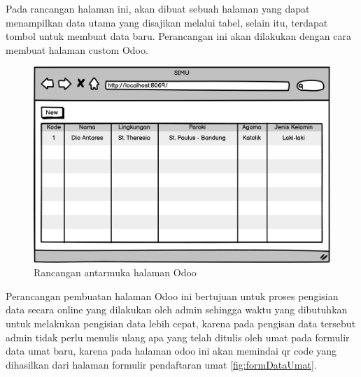 Pada rancangan halaman ini, akan dibuat sebuah halaman yang dapat menampilkan data utama yang disajikan melalui tabel, selain itu, terdapat tombol untuk membuat data baru. Perancangan ini akan dilakukan dengan cara membuat halaman custom Odoo. 

\begin{figure}[H]
	\centering
	\includegraphics[scale=0.8]{Gambar/mockUpOdoo.png}
	\caption{Rancangan antarmuka halaman Odoo} 
	\label{fig:mockupOdoo}
\end{figure}

Perancangan pembuatan halaman Odoo ini bertujuan untuk proses pengisian data secara online yang dilakukan oleh admin sehingga waktu yang dibutuhkan untuk melakukan pengisian data lebih cepat, karena pada pengisan data tersebut admin tidak perlu menulis ulang apa yang telah ditulis oleh umat pada formulir data umat baru, karena pada halaman odoo ini akan memindai qr code yang dihasilkan dari halaman formulir pendaftaran umat \ref{fig:formDataUmat}.




